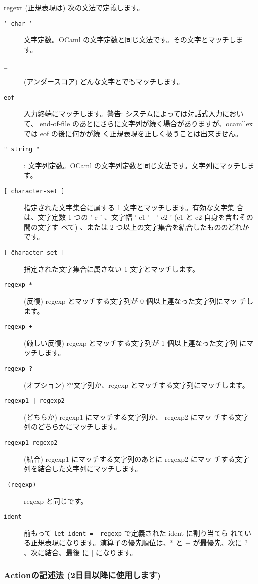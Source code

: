 \documentclass[a4paper,11pt]{jsarticle}
\begin{document}
regext (正規表現は) 次の文法で定義します。

\begin{description}
\item [\texttt{' char '}] 文字定数。OCaml の文字定数と同じ文法です。その文字とマッチします。
\item [\texttt{\_}] (アンダースコア) どんな文字とでもマッチします。
\item [\texttt{eof}] 入力終端にマッチします。警告: システムによっては対話式入力において、
  end-of-file のあとにさらに文字列が続く場合がありますが、ocamllex では eof の後に何かが続
  く正規表現を正しく扱うことは出来ません。
\item [\texttt{" string "}]: 文字列定数。OCaml の文字列定数と同じ文法です。文字列にマッチします。
\item [\texttt{[ character-set ]}] 指定された文字集合に属する 1 文字とマッチします。有効な文字集
  合は、文字定数 1 つの ' c ' 、文字幅 ' c1 ' - '  c2 ' (c1 と c2 自身を含むその間の文字す
  べて) 、または 2 つ以上の文字集合を結合したもののどれかです。
\item [\texttt{[ \^ character-set ]}] 指定された文字集合に属さない 1 文字とマッチします。
\item [\texttt{regexp *}] (反復) regexp とマッチする文字列が 0 個以上連なった文字列にマッ
  チします。
\item [\texttt{regexp +}] (厳しい反復) regexp とマッチする文字列が 1 個以上連なった文字列
  にマッチします。
\item [\texttt{regexp ?}] (オプション) 空文字列か、regexp とマッチする文字列にマッチします。
\item [\texttt{regexp1 | regexp2}] (どちらか) regexp1 にマッチする文字列か、 regexp2 にマッ
  チする文字列のどちらかにマッチします。
\item [\texttt{regexp1 regexp2}] (結合) regexp1 にマッチする文字列のあとに regexp2 にマッ
  チする文字列を結合した文字列にマッチします。
\item [\texttt{ (regexp) }] regexp と同じです。
\item [\texttt{ident}] 前もって \verb|let ident =  regexp| で定義された ident に割り当てら
  れている正規表現になります。演算子の優先順位は、* と + が最優先、次に ? 、次に結合、最後
  に | になります。
\end{description}

\subsubsection{Actionの記述法 (2日目以降に使用します)}
\end{document}
